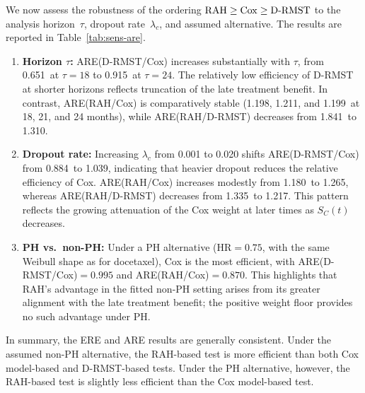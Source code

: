 \documentclass[12pt]{article}
\newcommand{\RAH}{\mathrm{RAH}}
\newcommand{\DRMST}{D\text{-}\mathrm{RMST}}
\newcommand{\AreDrmstCMTauEighteen}{0.651}
\newcommand{\AreDrmstCMTauTwentyfour}{0.915}
\newcommand{\AreRahCMTauEighteen}{1.198}
\newcommand{\AreRahCMTauTwentyone}{1.211}
\newcommand{\AreRahCMTauTwentyfour}{1.199}
\newcommand{\AreRahDrmstCMTauEighteen}{1.841}
\newcommand{\AreRahDrmstCMTauTwentyfour}{1.310}
\newcommand{\AreDrmstCMDropoutLow}{0.884}
\newcommand{\AreDrmstCMDropoutHigh}{1.039}
\newcommand{\AreRahCMDropoutLow}{1.180}
\newcommand{\AreRahCMDropoutHigh}{1.265}
\newcommand{\AreRahDrmstCMDropoutLow}{1.335}
\newcommand{\AreRahDrmstCMDropoutHigh}{1.217}
\newcommand{\AreDrmstCMPH}{0.995}
\newcommand{\AreRahCMPH}{0.870}
\begin{document}
We now assess the robustness of the ordering $\RAH \ge \rm{Cox} \ge \DRMST$
to the analysis horizon~$\tau$, dropout rate~$\lambda_c$, and assumed alternative. The results are reported in  Table~\ref{tab:sens-are}.
\begin{enumerate}
\item {\bf Horizon $\tau$:}
ARE(D-RMST/Cox) increases substantially with $\tau$, from \AreDrmstCMTauEighteen\ at $\tau=18$ to \AreDrmstCMTauTwentyfour\ at $\tau=24$. The relatively low efficiency of D-RMST at shorter horizons reflects truncation of the late treatment benefit. In contrast, ARE(RAH/Cox) is comparatively stable (\AreRahCMTauEighteen, \AreRahCMTauTwentyone, and \AreRahCMTauTwentyfour\ at 18, 21, and 24 months), while ARE(RAH/D-RMST) decreases from \AreRahDrmstCMTauEighteen\ to \AreRahDrmstCMTauTwentyfour.

\item {\bf Dropout rate:}
Increasing $\lambda_c$ from 0.001 to 0.020 shifts ARE(D-RMST/Cox) from \AreDrmstCMDropoutLow\ to \AreDrmstCMDropoutHigh, indicating that heavier dropout reduces the relative efficiency of Cox. ARE(RAH/Cox) increases modestly from \AreRahCMDropoutLow\ to \AreRahCMDropoutHigh, whereas ARE(RAH/D-RMST) decreases from \AreRahDrmstCMDropoutLow\ to \AreRahDrmstCMDropoutHigh. This pattern reflects the growing attenuation of the Cox weight at later times as $S_C(t)$ decreases.

\item {\bf PH vs.\ non-PH:}
Under a PH alternative (HR$=0.75$, with the same Weibull shape as for docetaxel), Cox is the most efficient, with ARE(D-RMST/Cox)$=\AreDrmstCMPH$ and ARE(RAH/Cox)$=\AreRahCMPH$. This highlights that RAH's advantage in the fitted non-PH setting arises from its greater alignment with the late treatment benefit; the positive weight floor provides no such advantage under PH.
\end{enumerate}

In summary, the ERE and ARE results are generally consistent. Under the assumed non-PH alternative, the RAH-based test is more efficient than both Cox model-based and D-RMST-based tests. Under the PH alternative, however, the RAH-based test is slightly less efficient than the Cox model-based test.
\end{document}
